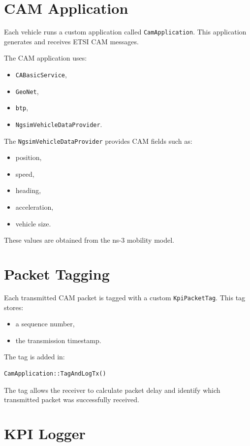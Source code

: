 \documentclass[11pt,a4paper]{article}
\begin{document}
\section{CAM Application}

Each vehicle runs a custom application called \texttt{CamApplication}. This application generates and receives ETSI CAM messages.

The CAM application uses:
\begin{itemize}
    \item \texttt{CABasicService},
    \item \texttt{GeoNet},
    \item \texttt{btp},
    \item \texttt{NgsimVehicleDataProvider}.
\end{itemize}

The \texttt{NgsimVehicleDataProvider} provides CAM fields such as:
\begin{itemize}
    \item position,
    \item speed,
    \item heading,
    \item acceleration,
    \item vehicle size.
\end{itemize}

These values are obtained from the ns-3 mobility model.

\section{Packet Tagging}

Each transmitted CAM packet is tagged with a custom \texttt{KpiPacketTag}. This tag stores:

\begin{itemize}
    \item a sequence number,
    \item the transmission timestamp.
\end{itemize}

The tag is added in:

\begin{lstlisting}[style=cppstyle]
CamApplication::TagAndLogTx()
\end{lstlisting}

The tag allows the receiver to calculate packet delay and identify which transmitted packet was successfully received.

\section{KPI Logger}
\end{document}
